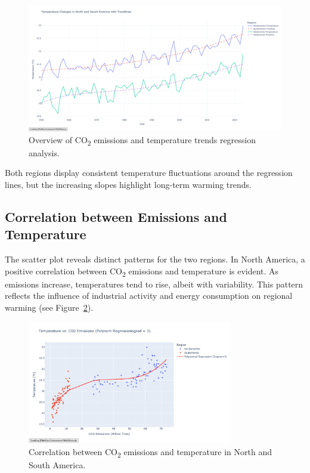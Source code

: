 \documentclass[a4paper,11pt]{article}
\begin{document}
\begin{figure}[htbp]
    \centering
    \includegraphics[width=\textwidth]{pics/temperature_trendlines.pdf} 
    \caption{Overview of CO\textsubscript{2} emissions and temperature trends regression analysis.}
    \label{fig:regression-overview}
\end{figure}

\noindent
Both regions display consistent temperature fluctuations around the regression lines, but the increasing slopes highlight long-term warming trends.

\subsection{Correlation between Emissions and Temperature}
The scatter plot reveals distinct patterns for the two regions. In North America, a positive correlation between CO\textsubscript{2} emissions and temperature is evident. As emissions increase, temperatures tend to rise, albeit with variability. This pattern reflects the influence of industrial activity and energy consumption on regional warming (see Figure~\ref{fig:corr}).

\begin{figure}[htbp]
    \centering
    \includegraphics[width=0.8\textwidth]{pics/temperature_vs_emissions.pdf} 
    \caption{Correlation between CO\textsubscript{2} emissions and temperature in North and South America.}
    \label{fig:corr}
\end{figure}
\end{document}
